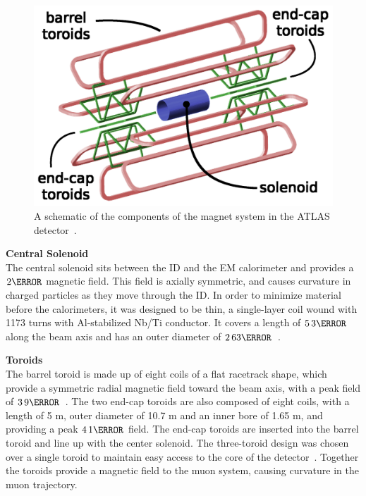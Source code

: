 \begin{figure}[!ht]
    \centering
    \includegraphics[width=.8\textwidth]{chapters/chapter2_experiment/images/magnetSystems.png}
    \caption[A schematic of the components of the magnet system in the ATLAS detector]{A schematic of the components of the magnet system in the ATLAS detector~\cite{magnet-schematic}.}
    \label{fig:magnetSystem}
\end{figure}

\noindent\textbf{Central Solenoid}\\
\indent The central solenoid sits between the \gls{ID} and the \gls{EM} calorimeter and provides a $\unit{2}{\tesla}$ magnetic field. This field is axially symmetric, and causes curvature in charged particles as they move through the \gls{ID}. In order to minimize material before the calorimeters, it was designed to be thin, a single-layer coil wound with 1173 turns with Al-stabilized Nb/Ti conductor. It covers a length of $\unit{5.3}{\meter}$ along the beam axis and has an outer diameter of $\unit{2.63}{\meter}$~\cite{central-solenoid}.

\noindent\textbf{Toroids}\\
\indent The barrel toroid is made up of eight coils of a flat racetrack shape, which provide a symmetric radial magnetic field toward the beam axis, with a peak field of $\unit{3.9}{\tesla}$~\cite{barrel-toroid}. The two end-cap toroids are also composed of eight coils, with a length of 5 m, outer diameter of 10.7 m and an inner bore of 1.65 m, and providing a peak $\unit{4.1}{\tesla}$ field. The end-cap toroids are inserted into the barrel toroid and line up with the center solenoid. The three-toroid design was chosen over a single toroid to maintain easy access to the core of the detector~\cite{endcap-toroid}. Together the toroids provide a magnetic field to the muon system, causing curvature in the muon trajectory.


